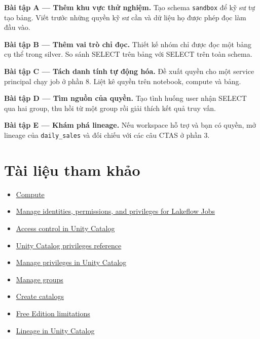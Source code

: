 \textbf{Bài tập A --- Thêm khu vực thử nghiệm.} Tạo schema \texttt{sandbox} để kỹ sư tự tạo bảng. Viết trước những quyền kỹ sư cần và dữ liệu họ được phép đọc làm đầu vào.


\textbf{Bài tập B --- Thêm vai trò chỉ đọc.} Thiết kế nhóm chỉ được đọc một bảng cụ thể trong silver. So sánh SELECT trên bảng với SELECT trên toàn schema.


\textbf{Bài tập C --- Tách danh tính tự động hóa.} Đề xuất quyền cho một service principal chạy job ở phần 8. Liệt kê quyền trên notebook, compute và bảng.


\textbf{Bài tập D --- Tìm nguồn của quyền.} Tạo tình huống user nhận SELECT qua hai group, thu hồi từ một group rồi giải thích kết quả truy vấn.


\textbf{Bài tập E --- Khám phá lineage.} Nếu workspace hỗ trợ và bạn có quyền, mở lineage của \texttt{daily\_\allowbreak{}sales} và đối chiếu với các câu CTAS ở phần 3.


\section*{Tài liệu tham khảo}

\begin{itemize}
\item \href{https://docs.databricks.com/aws/en/compute/}{Compute}
\item \href{https://docs.databricks.com/aws/en/jobs/privileges}{Manage identities, permissions, and privileges for Lakeflow Jobs}
\item \href{https://docs.databricks.com/aws/en/data-governance/unity-catalog/access-control/}{Access control in Unity Catalog}
\item \href{https://docs.databricks.com/aws/en/data-governance/unity-catalog/access-control/privileges-reference}{Unity Catalog privileges reference}
\item \href{https://docs.databricks.com/aws/en/data-governance/unity-catalog/manage-privileges/}{Manage privileges in Unity Catalog}
\item \href{https://docs.databricks.com/aws/en/admin/users-groups/manage-groups}{Manage groups}
\item \href{https://docs.databricks.com/aws/en/catalogs/create-catalog}{Create catalogs}
\item \href{https://docs.databricks.com/aws/en/getting-started/free-edition-limitations}{Free Edition limitations}
\item \href{https://docs.databricks.com/aws/en/data-governance/unity-catalog/data-lineage}{Lineage in Unity Catalog}
\end{itemize}
